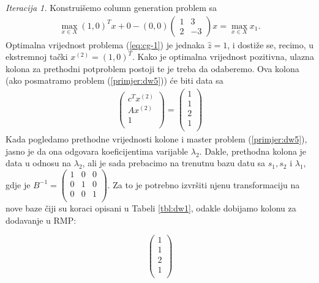 \documentclass[a4paper, utf8, 11pt, colorlinks]{book}
\begin{document}
\emph{Iteracija 1.} 
Konstruišemo column generation problem sa
\begin{align}\label{eq:cg-1}
	 \max_{x \in X} (1, 0)^T x + 0 - (0, 0) \left(\begin{array}{cc}
	 	1 & 3 \\
	 	2 & -3
	 \end{array}\right)  x = \max_{x \in X} x_1. 
\end{align} 
Optimalna vrijednost problema (\ref{eq:cg-1}) je jednaka $\hat{z}=1$, i dostiže se, recimo, u ekstremnoj tački $ x^{(2)}= (1, 0)^T.$ Kako je optimalna vrijednost pozitivna, ulazna kolona za prethodni potproblem postoji te je treba da odaberemo. Ova kolona (ako posmatramo problem (\ref{primjer:dw5})) će biti data sa 
\begin{align}
     \begin{pmatrix}
     	    c^T  x^{(2)} \\
     	    A x^{(2)}  \\
     	    1     \\
     \end{pmatrix} = \begin{pmatrix}
               1 \\
               1  \\
               2  \\
               1\\
 \end{pmatrix}
\end{align}
Kada pogledamo prethodne vrijednosti kolone i master problem (\ref{primjer:dw5}), jasno je da ona odgovara koeficijentima varijable $\lambda_2$. Dakle, prethodna kolona je data u odnosu na $\lambda_2$, ali je sada prebacimo na trenutnu bazu datu sa $s_1, s_2$ i $\lambda_1$, gdje je $B^{-1} =  \begin{pmatrix}
	1 & 0 & 0 \\
	0 & 1 & 0  \\
	0 & 0 & 1  \\
\end{pmatrix}. $ %
Za to je potrebno izvršiti njenu transformaciju na nove baze čiji su koraci opisani u Tabeli \ref{tbl:dw1}, odakle dobijamo kolonu za dodavanje u RMP:
 
$$	\begin{pmatrix}
	       1 \\
	      1  \\
	      2  \\
	      1\\
	\end{pmatrix}
 $$
\end{document}
